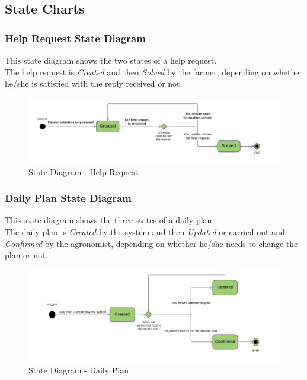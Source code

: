 \subsection{State Charts}

\subsubsection{Help Request State Diagram}
This state diagram shows the two states of a help request.\\
The help request is \textit{Created} and then \textit{Solved} by the farmer, depending on whether he/she is satisfied with the reply received or not.
\begin{figure}[h!]
  \includegraphics[width=\textwidth,height=\textheight,keepaspectratio]{./Images/State Chart HelpRequest.png}
  \caption{State Diagram - Help Request}
\end{figure}

\subsubsection{Daily Plan State Diagram}
This state diagram shows the three states of a daily plan.\\
The daily plan is \textit{Created} by the system and then \textit{Updated} or carried out and \textit{Confirmed} by the agronomist, depending on whether he/she needs to change the plan or not.
\begin{figure}[h!]
  \includegraphics[width=\textwidth,height=\textheight,keepaspectratio]{./Images/State Chart DailyPlan.png}
  \caption{State Diagram - Daily Plan}
\end{figure}

